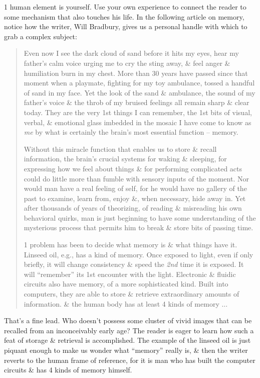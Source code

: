 \documentclass{article}
\begin{document}
1 human element is yourself. Use your own experience to connect the reader to some mechanism that also touches his life. In the following article on memory, notice how the writer, Will Bradbury, gives us a personal handle with which to grab a complex subject:
\begin{quotation}
	Even now I see the dark cloud of sand before it hits my eyes, hear my father's calm voice urging me to cry the sting away, \& feel anger \& humiliation burn in my chest. More than 30 years have passed since that moment when a playmate, fighting for my toy ambulance, tossed a handful of sand in my face. Yet the look of the sand \& ambulance, the sound of my father's voice \& the throb of my bruised feelings all remain sharp \& clear today. They are the very 1st things I can remember, the 1st bits of visual, verbal, \& emotional glass imbedded in the mosaic I have come to know as \textit{me} by what is certainly the brain's most essential function -- memory.
	
	Without this miracle function that enables us to store \& recall information, the brain's crucial systems for waking \& sleeping, for expressing how we feel about things \& for performing complicated acts could do little more than fumble with sensory inputs of the moment. Nor would man have a real feeling of self, for he would have no gallery of the past to examine, learn from, enjoy \&, when necessary, hide away in. Yet after thousands of years of theorizing, of reading \& misreading his own behavioral quirks, man is just beginning to have some understanding of the mysterious process that permits him to break \& store bits of passing time.
	
	1 problem has been to decide what memory is \& what things have it. Linseed oil, e.g., has a kind of memory. Once exposed to light, even if only briefly, it will change consistency \& speed the \textit{2nd} time it is exposed. It will ``remember'' its 1st encounter with the light. Electronic \& fluidic circuits also have memory, of a more sophisticated kind. Built into computers, they are able to store \& retrieve extraordinary amounts of information. \& the human body has at least 4 kinds of memory $\ldots$
\end{quotation}
That's a fine lead. Who doesn't possess some cluster of vivid images that can be recalled from an inconceivably early age? The reader is eager to learn how such a feat of storage \& retrieval is accomplished. The example of the linseed oil is just piquant enough to make us wonder what ``memory'' really is, \& then the writer reverts to the human frame of reference, for it is man who has built the computer circuits \& has 4 kinds of memory himself.
\end{document}
